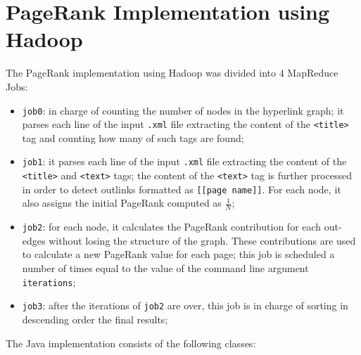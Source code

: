 \documentclass[11pt,a4paper]{article}
\begin{document}
\section{PageRank Implementation using Hadoop}
The PageRank implementation using Hadoop was divided into $4$ MapReduce Jobs:
\begin{itemize}
    \item \texttt{job0}: in charge of counting the number of nodes in the hyperlink graph; it parses each line of the input \texttt{.xml} file extracting the content of the \texttt{<title>} tag and counting how many of such tags are found;
    \item \texttt{job1}: it parses each line of the input \texttt{.xml} file extracting the content of the \texttt{<title>} and \texttt{<text>} tags; the content of the \texttt{<text>} tag is further processed in order to detect outlinks formatted as \texttt{[[page name]]}. For each node, it also assigns the initial PageRank computed as $\frac{1}{N}$;
    \item \texttt{job2}: for each node, it calculates the PageRank contribution for each out-edges without losing the structure of the graph. These contributions are used to calculate a new PageRank value for each page; this job is scheduled a number of times equal to the value of the command line argument \texttt{iterations};
    \item \texttt{job3}: after the iterations of \texttt{job2} are over, this job is in charge of sorting in descending order the final results;
\end{itemize}
The Java implementation consists of the following classes:
\end{document}
